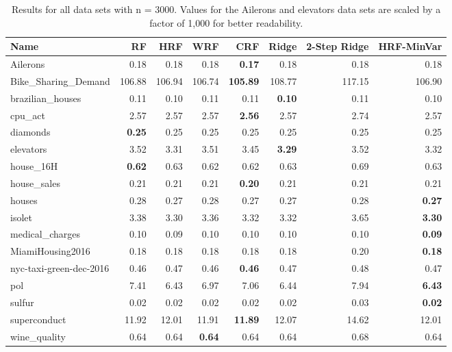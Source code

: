 \begin{table}[ht]
\centering
\begingroup\scriptsize
\begin{tabular}{lrrrrrrr}
  \hline
\textbf{ Name } & \textbf{ RF } & \textbf{ HRF } & \textbf{ WRF } & \textbf{ CRF } & \textbf{ Ridge } & \textbf{ 2-Step Ridge } & \textbf{ HRF-MinVar } \\ 
  \hline
Ailerons & 0.18 & 0.18 & 0.18 & \textbf{0.17} & 0.18 & 0.18 & 0.18 \\ 
  Bike\_Sharing\_Demand & 106.88 & 106.94 & 106.74 & \textbf{105.89} & 108.77 & 117.15 & 106.90 \\ 
  brazilian\_houses & 0.11 & 0.10 & 0.11 & 0.11 & \textbf{0.10} & 0.11 & 0.10 \\ 
  cpu\_act & 2.57 & 2.57 & 2.57 & \textbf{2.56} & 2.57 & 2.74 & 2.57 \\ 
  diamonds & \textbf{0.25} & 0.25 & 0.25 & 0.25 & 0.25 & 0.25 & 0.25 \\ 
  elevators & 3.52 & 3.31 & 3.51 & 3.45 & \textbf{3.29} & 3.52 & 3.32 \\ 
  house\_16H & \textbf{0.62} & 0.63 & 0.62 & 0.62 & 0.63 & 0.69 & 0.63 \\ 
  house\_sales & 0.21 & 0.21 & 0.21 & \textbf{0.20} & 0.21 & 0.21 & 0.21 \\ 
  houses & 0.28 & 0.27 & 0.28 & 0.27 & 0.27 & 0.28 & \textbf{0.27} \\ 
  isolet & 3.38 & 3.30 & 3.36 & 3.32 & 3.32 & 3.65 & \textbf{3.30} \\ 
  medical\_charges & 0.10 & 0.09 & 0.10 & 0.10 & 0.10 & 0.10 & \textbf{0.09} \\ 
  MiamiHousing2016 & 0.18 & 0.18 & 0.18 & 0.18 & 0.18 & 0.20 & \textbf{0.18} \\ 
  nyc-taxi-green-dec-2016 & 0.46 & 0.47 & 0.46 & \textbf{0.46} & 0.47 & 0.48 & 0.47 \\ 
  pol & 7.41 & 6.43 & 6.97 & 7.06 & 6.44 & 7.94 & \textbf{6.43} \\ 
  sulfur & 0.02 & 0.02 & 0.02 & 0.02 & 0.02 & 0.03 & \textbf{0.02} \\ 
  superconduct & 11.92 & 12.01 & 11.91 & \textbf{11.89} & 12.07 & 14.62 & 12.01 \\ 
  wine\_quality & 0.64 & 0.64 & \textbf{0.64} & 0.64 & 0.64 & 0.68 & 0.64 \\ 
   \hline
\end{tabular}
\endgroup
\caption{Results for all data sets with n = 3000. Values for the Ailerons and elevators data sets are scaled by a factor of 1,000 for better readability.} 
\end{table}
